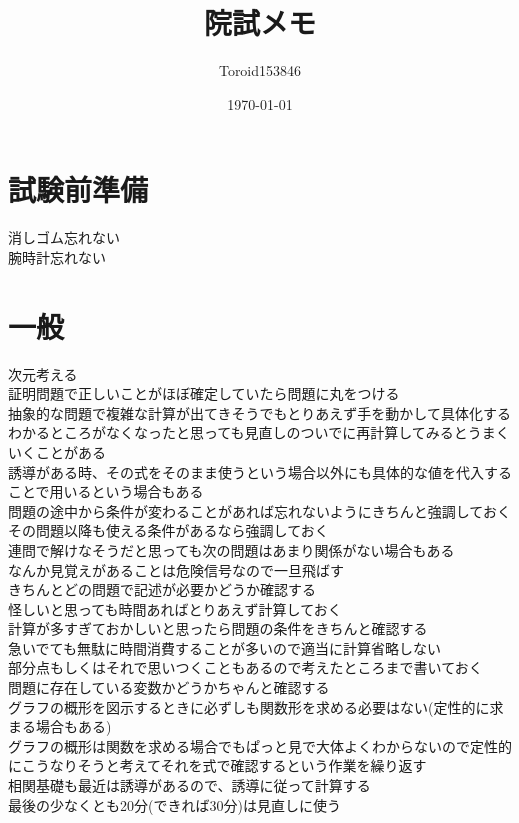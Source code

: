 \documentclass{ltjsarticle}
\title{院試メモ}
\author{Toroid153846}
\date{\today}
\begin{document}
\maketitle
  \section{試験前準備}
  消しゴム忘れない\\
  腕時計忘れない
  \section{一般}
  次元考える\\
  証明問題で正しいことがほぼ確定していたら問題に丸をつける\\
  抽象的な問題で複雑な計算が出てきそうでもとりあえず手を動かして具体化する\\
  わかるところがなくなったと思っても見直しのついでに再計算してみるとうまくいくことがある\\
  誘導がある時、その式をそのまま使うという場合以外にも具体的な値を代入することで用いるという場合もある\\
  問題の途中から条件が変わることがあれば忘れないようにきちんと強調しておく\\
  その問題以降も使える条件があるなら強調しておく\\
  連問で解けなそうだと思っても次の問題はあまり関係がない場合もある\\
  なんか見覚えがあることは危険信号なので一旦飛ばす\\
  きちんとどの問題で記述が必要かどうか確認する\\
  怪しいと思っても時間あればとりあえず計算しておく\\
  計算が多すぎておかしいと思ったら問題の条件をきちんと確認する\\
  急いでても無駄に時間消費することが多いので適当に計算省略しない\\
  部分点もしくはそれで思いつくこともあるので考えたところまで書いておく\\
  問題に存在している変数かどうかちゃんと確認する\\
  グラフの概形を図示するときに必ずしも関数形を求める必要はない(定性的に求まる場合もある)\\
  グラフの概形は関数を求める場合でもぱっと見で大体よくわからないので定性的にこうなりそうと考えてそれを式で確認するという作業を繰り返す\\
  相関基礎も最近は誘導があるので、誘導に従って計算する\\
  最後の少なくとも20分(できれば30分)は見直しに使う\\
\end{document}
